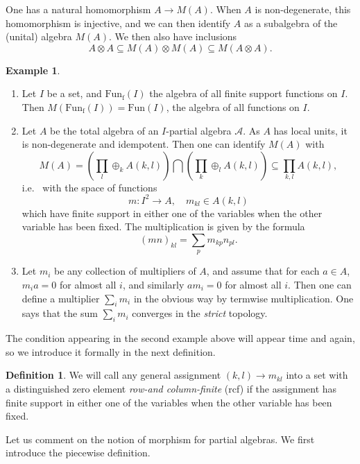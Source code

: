 \documentclass[10pt]{article}
\DeclareMathOperator{\fin}{\mathrm{f}}
\newcommand{\Fun}{\mathrm{Fun}}
\theoremstyle{definition}
\newtheorem{Def}[Theorem]{Definition}
\newtheorem{Exa}[Theorem]{Example}
\numberwithin{equation}{section}
\begin{document}
One has a natural homomorphism $A\rightarrow M(A)$. When $A$ is non-degenerate,  this homomorphism is injective, and we can then identify $A$ as a subalgebra of the (unital) algebra $M(A)$. We then also have inclusions \[A\otimes A\subseteq M(A)\otimes M(A)\subseteq M(A\otimes A).\]

\begin{Exa}\label{ExaMult} 
\begin{enumerate}
\item Let $I$ be a set, and $\Fun_{\fin}(I)$ the algebra of all finite support functions on $I$. Then $M(\Fun_{\fin}(I)) = \Fun(I)$, the algebra of all functions on $I$. 
\item Let $A$ be the total algebra of an $I$-partial algebra $\mathscr{A}$. As $A$ has local units, it is non-degenerate and idempotent. Then one can identify $M(A)$ with \[M(A) = \left(\prod_l \oplus_k A(k,l)\right) \bigcap \left(\prod_k\oplus_l A(k,l)\right) \subseteq \prod_{k,l} A(k,l),\] i.e.~ with the space of functions \[m:I^2\rightarrow A,\quad m_{kl}\in A(k,l)\] which have finite support in either one of the variables when the other variable has been fixed. The multiplication is given by the formula \[(mn)_{kl} = \sum_p m_{kp}n_{pl}.\]
\item Let $m_i$ be any collection of multipliers of $A$, and assume that for each $a\in A$, $m_ia =0$ for almost all $i$, and similarly $am_i=0$ for almost all $i$. Then one can define a multiplier $\sum_i m_i$ in the obvious way by termwise multiplication. One says that the sum $\sum_i m_i$ converges in the \emph{strict} topology. 
\end{enumerate}
\end{Exa}

The condition appearing in the second example above will appear time and again, so we introduce it formally in the next definition.

\begin{Def} We will call any general assignment $(k,l)\rightarrow m_{kl}$ into a set with a distinguished zero element \emph{row-and column-finite} (rcf) if the assignment has finite support in either one of the variables when the other variable has been fixed. 
\end{Def} 

Let us comment on the notion of morphism for partial algebras. We first introduce the piecewise definition.
\end{document}
